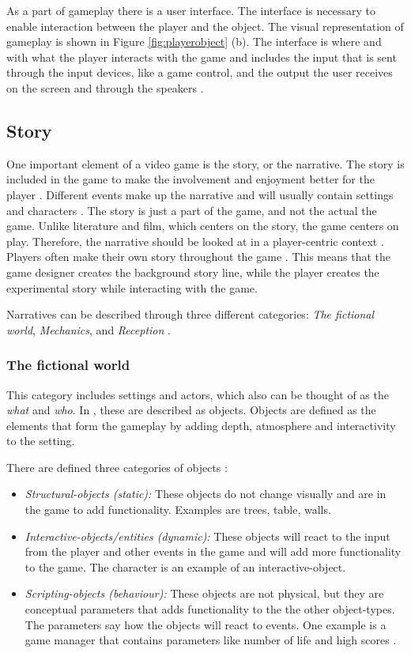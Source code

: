 As a part of gameplay there is a user interface. The interface is necessary to enable interaction between the player and the object. The visual representation of gameplay  is shown in Figure \ref{fig:playerobject} (b). The interface is where and with what the player interacts with the game and includes the input that is sent through the input devices, like a game control, and the output the user receives on the screen and through the speakers \cite{umlapproach}.

\subsection{Story}
One important element of a video game is the story, or the narrative. The story is included in the game to make the involvement and enjoyment better for the player \cite{umlapproach}. Different events make up the narrative and will usually contain settings and characters \cite{understandingvg}. The story is just a part of the game, and not the actual the game. Unlike literature and film, which centers on the story, the game centers on play. Therefore, the narrative should be looked at in a player-centric context \cite{gametheory}. Players often make their own story throughout the game \cite{umlapproach}. This means that the game designer creates the background story line, while the player creates the experimental story while interacting with the game. 

Narratives can be described through three different categories: \emph{The fictional world}, \emph{Mechanics}, and \emph{Reception} \cite{understandingvg}.

\subsubsection{The fictional world}
\label{subsub:fictionalworld}
This category includes settings and actors, which also can be thought of as the \emph{what} and \emph{who}. In \cite{beram}, these are described as objects. Objects are defined as the elements that form the gameplay by adding depth, atmosphere and interactivity to the setting.

There are defined three categories of objects \cite{beram}:
\begin{itemize}
\item \emph{Structural-objects (static):} These objects do not change visually and are in the game to add functionality. Examples are trees, table, walls.
\item \emph{Interactive-objects/entities (dynamic):} These objects will react to the input from the player and other events in the game and will add more functionality to the game. The character is an example of an interactive-object.
\item \emph{Scripting-objects (behaviour):} These objects are not physical, but they are conceptual parameters that adds functionality to the the other object-types. The parameters say how the objects will react to events. One example is a game manager that contains parameters like number of life and high scores \cite{umlapproach}. 
\end{itemize}

